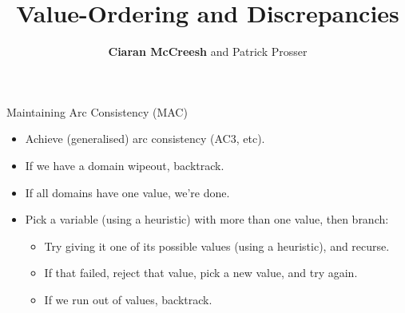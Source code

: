 \documentclass{beamer}
\title{Value-Ordering and Discrepancies}
\author[Ciaran McCreesh and Patrick Prosser]{\textbf{Ciaran McCreesh} and Patrick Prosser}
\begin{document}
{
    \begin{frame}
        \titlepage
    \end{frame}
}

\begin{frame}{Maintaining Arc Consistency (MAC)}
     {
        \begin{itemize}
            \item Achieve (generalised) arc consistency (AC3, etc).
            \item If we have a domain wipeout, backtrack.
            \item If all domains have one value, we're done.
            \item Pick a variable (using a heuristic) with more than one value, then branch:
                \begin{itemize}
                    \item Try giving it one of its possible values (using a heuristic), and recurse.
                    \item If that failed, reject that value, pick a new value, and try again.
                    \item If we run out of values, backtrack.
                \end{itemize}
        \end{itemize}
    }
\end{frame}
\end{document}
